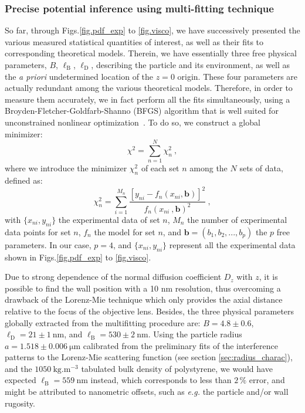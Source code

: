 \subsubsection{Precise potential inference using multi-fitting technique}
So far, through Figs.\ref{fig.pdf_exp} to \ref{fig.visco}, we have successively presented the various measured statistical quantities of interest, as well as their fits to corresponding theoretical models. Therein, we have essentially three free physical parameters, $B$, $\ell_\mathrm{B}$, $\ell_\mathrm{D}$, describing the particle and its environment, as well as the \textit{a priori} undetermined location of the $z=0$ origin. These four parameters are actually redundant among the various theoretical models. Therefore, in order to measure them accurately, we in fact perform all the fits simultaneously,
using a Broyden-Fletcher-Goldfarb-Shanno (BFGS) algorithm that is well suited for unconstrained
nonlinear optimization~\cite{dai_convergence_2002}. To do so, we construct a global minimizer:
\begin{equation}
	\chi ^ 2 = \sum _{n=1} ^{N} \chi_n ^ 2\ ,
\end{equation}
where we introduce the minimizer $\chi _n ^2$ of each set $n$ among the $N$ sets of data, defined as:
\begin{equation}
	\chi _n ^2 = \sum _{i=1} ^{M_n} \frac{[y_{ni} - f_n(x_{ni}, \mathbf{b})]^2 }{f_n(x_{ni}\ , \mathbf{b})^2}\ ,
\end{equation}
with $\{x_{ni},y_{ni}\}$ the experimental data of set $n$, $M_n$ the number of experimental data points for set $n$, $f_n$ the model for set $n$, and $\mathbf{b}=(b_1,b_2,...,b_p)$ the $p$ free parameters. In our case, $p=4$, and $\{x_{ni},y_{ni}\}$ represent all the experimental data shown in Figs.\ref{fig.pdf_exp} to \ref{fig.visco}. 

Due to strong dependence of the normal diffusion coefficient $D_z$ with $z$, it is possible to find the wall position with a 10 nm resolution, thus overcoming a drawback of the Lorenz-Mie technique which only provides the axial distance relative to the focus of the objective lens. Besides, the three physical parameters globally extracted from the multifitting procedure are: $B = 4.8 \pm 0.6$, $\ell_\mathrm{D} = 21 \pm 1~ \mathrm{nm} $, and $\ell_\mathrm{B} = 530 \pm 2~ \mathrm{nm}$. Using the particle radius $a = 1.518 \pm 0.006 ~ \mathrm{\mu m}$ calibrated from the preliminary fits of the interference patterns to the Lorenz-Mie scattering function (see section \ref{sec:radius_charac}), and the $1050 ~ \mathrm{kg.m^{-3}}$ tabulated bulk density of polystyrene, we would have expected $\ell_\mathrm{B}=559 ~ \mathrm{nm}$ instead, which corresponds to less than $2\,\%$ error, and might be attributed to nanometric offsets, such as \textit{e.g.} the particle and/or wall rugosity. 

